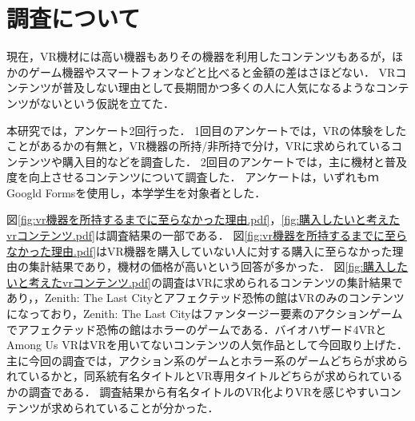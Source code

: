 \documentclass[twocolumn,10pt,a4j]{ltjsarticle}
\begin{document}



\section{調査について}
現在，VR機材には高い機器もありその機器を利用したコンテンツもあるが，ほかのゲーム機器やスマートフォンなどと比べると金額の差はさほどない．
VRコンテンツが普及しない理由として長期間かつ多くの人に人気になるようなコンテンツがないという仮説を立てた．

本研究では，アンケート2回行った．
1回目のアンケートでは，VRの体験をしたことがあるかの有無と，VR機器の所持/非所持で分け，VRに求められているコンテンツや購入目的などを調査した．
2回目のアンケートでは，主に機材と普及度を向上させるコンテンツについて調査した．
アンケートは，いずれもｍGoogld Formsを使用し，本学学生を対象者とした．

図\ref{fig:vr機器を所持するまでに至らなかった理由.pdf}，\ref{fig:購入したいと考えたvrコンテンツ.pdf}は調査結果の一部である．
図\ref{fig:vr機器を所持するまでに至らなかった理由.pdf}はVR機器を購入していない人に対する購入に至らなかった理由の集計結果であり，機材の価格が高いという回答が多かった．
図\ref{fig:購入したいと考えたvrコンテンツ.pdf}の調査はVRに求められるコンテンツの集計結果であり，，Zenith: The Last Cityとアフェクテッド恐怖の館はVRのみのコンテンツになっており，Zenith: The Last Cityはファンタージー要素のアクションゲームでアフェクテッド恐怖の館はホラーのゲームである．バイオハザード4VRとAmong Us VRはVRを用いてないコンテンツの人気作品として今回取り上げた．
主に今回の調査では，アクション系のゲームとホラー系のゲームどちらが求められているかと，同系統有名タイトルとVR専用タイトルどちらが求められているかの調査である．
調査結果から有名タイトルのVR化よりVRを感じやすいコンテンツが求められていることが分かった．
\end{document}
